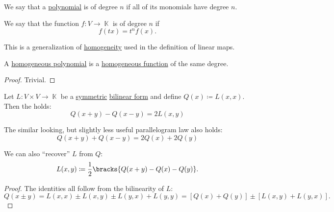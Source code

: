 \begin{definition}\label{def:homogeneous_polynomial}\mimprovised
  We say that a \hyperref[def:polynomial_algebra]{polynomial} is  of degree \( n \) if all of its monomials have degree \( n \).
\end{definition}

\begin{definition}\label{def:homogenous_function}\mimprovised
  We say that the function \( f: V \to \BbbK \) is  of degree \( n \) if
  \begin{equation*}
    f(t x) = t^n f(x).
  \end{equation*}

  This is a generalization of \hyperref[eq:def:semimodule/homomorphism/homogeneity]{homogeneity} used in the definition of linear maps.
\end{definition}

\begin{proposition}\label{thm:homogeneous_polynomial_is_homogeneous_function}
  A \hyperref[def:homogeneous_polynomial]{homogeneous polynomial} is a \hyperref[def:homogenous_function]{homogeneous function} of the same degree.
\end{proposition}
\begin{proof}
  Trivial.
\end{proof}

\begin{proposition}\label{thm:polarization_identity}
  Let \( L: V \times V \to \BbbK \) be a \hyperref[def:symmetric_function]{symmetric} \hyperref[def:bilinear_form]{bilinear form} and define \( Q(x) \coloneqq L(x, x) \). Then the  holds:
  \begin{equation}\label{thm:polarization_identity/polarization_identity}
    Q(x + y) - Q(x - y) = 2 L(x, y)
  \end{equation}

  The similar looking, but slightly less useful parallelogram law also holds:
  \begin{equation}\label{thm:polarization_identity/parallelogram_law}
    Q(x + y) + Q(x - y) = 2 Q(x) + 2 Q(y)
  \end{equation}

  We can also \enquote{recover} \( L \) from \( Q \):
  \begin{equation}\label{thm:polarization_identity/definition}
    L(x, y) \coloneqq \frac 1 2 \bracks{ Q(x + y) - Q(x) - Q(y) }.
  \end{equation}
\end{proposition}
\begin{proof}
  The identities all follow from the bilinearity of \( L \):
  \begin{equation*}
    Q(x \pm y)
    =
    L(x, x) \pm L(x, y) \pm L(y, x) + L(y, y)
    =
    [Q(x) + Q(y)] \pm [L(x, y) + L(y, x)].
  \end{equation*}
\end{proof}

